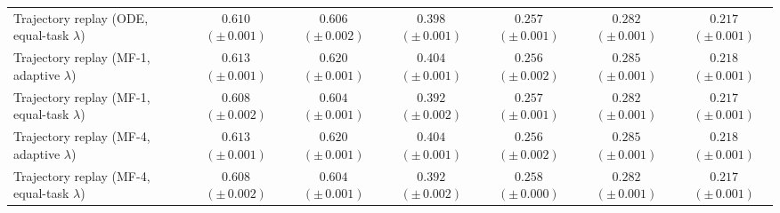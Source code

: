 \begin{table}[t]
{\begin{tabular}{@{}lcccccc@{}}
\rowcolor{trajectoryrow} Trajectory replay (ODE, equal-task $\lambda$) & $0.610$ {\scriptsize $(\pm\,0.001)$} & $0.606$ {\scriptsize $(\pm\,0.002)$} & $0.398$ {\scriptsize $(\pm\,0.001)$} & $0.257$ {\scriptsize $(\pm\,0.001)$} & $0.282$ {\scriptsize $(\pm\,0.001)$} & $0.217$ {\scriptsize $(\pm\,0.001)$} \\
\rowcolor{trajectoryrow} Trajectory replay (MF-1, adaptive $\lambda$) & $0.613$ {\scriptsize $(\pm\,0.001)$} & $0.620$ {\scriptsize $(\pm\,0.001)$} & $0.404$ {\scriptsize $(\pm\,0.001)$} & $0.256$ {\scriptsize $(\pm\,0.002)$} & $0.285$ {\scriptsize $(\pm\,0.001)$} & $0.218$ {\scriptsize $(\pm\,0.001)$} \\
\rowcolor{trajectoryrow} Trajectory replay (MF-1, equal-task $\lambda$) & $0.608$ {\scriptsize $(\pm\,0.002)$} & $0.604$ {\scriptsize $(\pm\,0.001)$} & $0.392$ {\scriptsize $(\pm\,0.002)$} & $0.257$ {\scriptsize $(\pm\,0.001)$} & $0.282$ {\scriptsize $(\pm\,0.001)$} & $0.217$ {\scriptsize $(\pm\,0.001)$} \\
\rowcolor{trajectoryrow} Trajectory replay (MF-4, adaptive $\lambda$) & $0.613$ {\scriptsize $(\pm\,0.001)$} & $0.620$ {\scriptsize $(\pm\,0.001)$} & $0.404$ {\scriptsize $(\pm\,0.001)$} & $0.256$ {\scriptsize $(\pm\,0.002)$} & $0.285$ {\scriptsize $(\pm\,0.001)$} & $0.218$ {\scriptsize $(\pm\,0.001)$} \\
\rowcolor{trajectoryrow} Trajectory replay (MF-4, equal-task $\lambda$) & $0.608$ {\scriptsize $(\pm\,0.002)$} & $0.604$ {\scriptsize $(\pm\,0.001)$} & $0.392$ {\scriptsize $(\pm\,0.002)$} & $0.258$ {\scriptsize $(\pm\,0.000)$} & $0.282$ {\scriptsize $(\pm\,0.001)$} & $0.217$ {\scriptsize $(\pm\,0.001)$} \\
\bottomrule
\end{tabular}%
}
\end{table}
